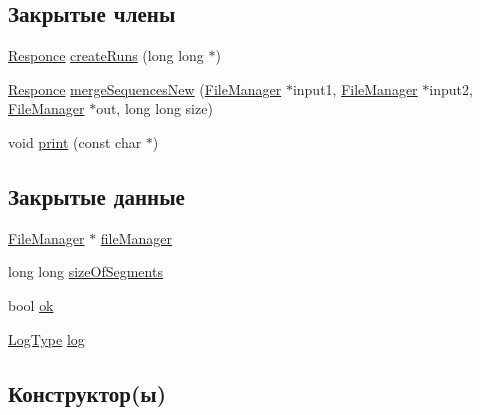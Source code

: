 \subsection*{Закрытые члены}
\begin{DoxyCompactItemize}
\item 
\hyperlink{_structures_8h_a9864d6ef28dd6e38416afac4426b3491}{Responce} \hyperlink{class_external_merge_sort_a54203f48d659003f5a75425354d4e262}{create\+Runs} (long long $\ast$)
\item 
\hyperlink{_structures_8h_a9864d6ef28dd6e38416afac4426b3491}{Responce} \hyperlink{class_external_merge_sort_a8b4f951d9ee53818b8d3d4e84e2a1aa4}{merge\+Sequences\+New} (\hyperlink{class_file_manager}{File\+Manager} $\ast$input1, \hyperlink{class_file_manager}{File\+Manager} $\ast$input2, \hyperlink{class_file_manager}{File\+Manager} $\ast$out, long long size)
\item 
void \hyperlink{class_external_merge_sort_a5e19d768fb9ef81e36e22e2eff498ca4}{print} (const char $\ast$)
\end{DoxyCompactItemize}
\subsection*{Закрытые данные}
\begin{DoxyCompactItemize}
\item 
\hyperlink{class_file_manager}{File\+Manager} $\ast$ \hyperlink{class_external_merge_sort_ab82d3b62a57be6c80dbd12b90de278e2}{file\+Manager}
\item 
long long \hyperlink{class_external_merge_sort_a1d68bb5e0373cf16807a41272dff1a99}{size\+Of\+Segments}
\item 
bool \hyperlink{class_external_merge_sort_a4b050cd230e144a11f65e57523e15ce6}{ok}
\item 
\hyperlink{_structures_8h_af67907baa897e9fb84df0cb89795b87c}{Log\+Type} \hyperlink{class_external_merge_sort_a41f61c3beb7dc529d7f2a8b2b4ee380b}{log}
\end{DoxyCompactItemize}


\subsection{Конструктор(ы)}
\hypertarget{class_external_merge_sort_a7b6efcd2abbf59a8983f972c52d04650}{}\label{class_external_merge_sort_a7b6efcd2abbf59a8983f972c52d04650} 
